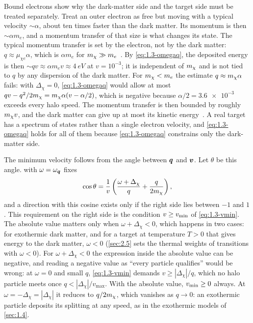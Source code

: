 Bound electrons show why the dark-matter side and the target side must be treated separately. Treat an outer electron as free but moving with a typical velocity $\sim \alpha$, about ten times faster than the dark matter. Its momentum is then $\sim \alpha m_e$, and a momentum transfer of that size is what changes its state. The typical momentum transfer is set by the electron, not by the dark matter: $q \approx \mu_{\chi e}\alpha$, which is $\alpha m_e$ for $m_{\chi} \gg m_e$~\cite[Eqs.~(117) and (118)]{lin2019tasi}. By \cref{eq:1.3-omegaq}, the deposited energy is then $\sim qv \approx \alpha m_e v \approx \SI{4}{eV}$ at $v = 10^{-3}$; it is independent of $m_{\chi}$ and is not tied to $q$ by any dispersion of the dark matter. For $m_{\chi} < m_e$ the estimate $q \approx m_{\chi}\alpha$ fails: with $\Delta_\chi = 0$, \cref{eq:1.3-omegaq} would allow at most $qv - q^2/2m_{\chi} = m_{\chi}\alpha(v - \alpha/2)$, which is negative because $\alpha/2 = \num{3.6e-3}$ exceeds every halo speed. The momentum transfer is then bounded by roughly $m_{\chi} v$, and the dark matter can give up at most its kinetic energy~\cite[Eq.~(119)]{lin2019tasi}. A real target has a spectrum of states rather than a single electron velocity, and \cref{eq:1.3-omegaq} holds for all of them because \cref{eq:1.3-omegaq} constrains only the dark-matter side.

The minimum velocity follows from the angle between $\bm{q}$ and $\bm{v}$. Let $\theta$ be this angle.  with $\omega = \omega_{\bm{q}}$ fixes
\begin{equation*}
  \cos\theta = \frac{1}{v}\left(\frac{\omega + \Delta_\chi}{q} + \frac{q}{2m_{\chi}}\right),
\end{equation*}
and a direction with this cosine exists only if the right side lies between $-1$ and $1$. This requirement on the right side is the condition $v \ge v_{\mathrm{min}}$ of \cref{eq:1.3-vmin}. The absolute value matters only when $\omega + \Delta_\chi < 0$, which happens in two cases: for exothermic dark matter, and for a target at temperature $T > 0$ that gives energy to the dark matter, $\omega < 0$ (\cref{sec:2.5} sets the thermal weights of transitions with $\omega < 0$). For $\omega + \Delta_\chi < 0$ the expression inside the absolute value can be negative, and reading a negative value as ``every particle qualifies'' would be wrong: at $\omega = 0$ and small $q$, \cref{eq:1.3-vmin} demands $v \ge |\Delta_\chi|/q$, which no halo particle meets once $q < |\Delta_\chi|/v_{\mathrm{max}}$. With the absolute value, $v_{\mathrm{min}} \ge 0$ always. At $\omega = -\Delta_\chi = |\Delta_\chi|$ it reduces to $q/2m_{\chi}$, which vanishes as $q \to 0$: an exothermic particle deposits its splitting at any speed, as in the exothermic models of \cref{sec:1.4}.


